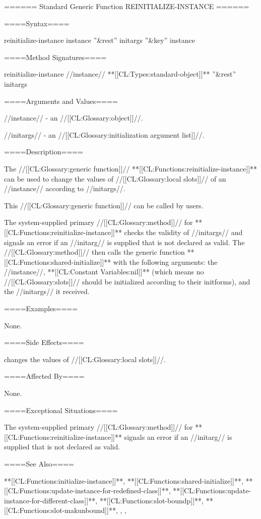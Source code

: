 ====== Standard Generic Function REINITIALIZE-INSTANCE ======

====Syntax====


\DefgenWithValues reinitialize-instance {instance ''&rest'' initargs ''&key'' {\allowotherkeys}} {instance}

====Method Signatures====

\Defmeth reinitialize-instance {//instance// **[[CL:Types:standard-object]]** ''&rest'' initargs}

====Arguments and Values====

//instance// - an //[[CL:Glossary:object]]//.

//initargs// - an //[[CL:Glossary:initialization argument list]]//.

====Description====

The //[[CL:Glossary:generic function]]// **[[CL:Functions:reinitialize-instance]]** can be used to change the values of //[[CL:Glossary:local slots]]// of an //instance// according to //initargs//.

This //[[CL:Glossary:generic function]]// can be called by users.

The system-supplied primary //[[CL:Glossary:method]]// for **[[CL:Functions:reinitialize-instance]]** checks the validity of //initargs// and signals an error if an //initarg// is supplied that is not declared as valid. The //[[CL:Glossary:method]]// then calls the generic function **[[CL:Functions:shared-initialize]]** with the following arguments: the //instance//, **[[CL:Constant Variables:nil]]** (which means no //[[CL:Glossary:slots]]// should be initialized according to their initforms), and the //initargs// it received.

====Examples====

None.

====Side Effects====

 changes the values of //[[CL:Glossary:local slots]]//.

====Affected By====

None.

====Exceptional Situations====

The system-supplied primary //[[CL:Glossary:method]]// for **[[CL:Functions:reinitialize-instance]]** signals an error if an //initarg// is supplied that is not declared as valid.

====See Also====

**[[CL:Functions:initialize-instance]]**, **[[CL:Functions:shared-initialize]]**, **[[CL:Functions:update-instance-for-redefined-class]]**, **[[CL:Functions:update-instance-for-different-class]]**, **[[CL:Functions:slot-boundp]]**, **[[CL:Functions:slot-makunbound]]**, {\secref\InstanceReInit}, {\secref\InitargRules}, {\secref\DeclaringInitargValidity}

